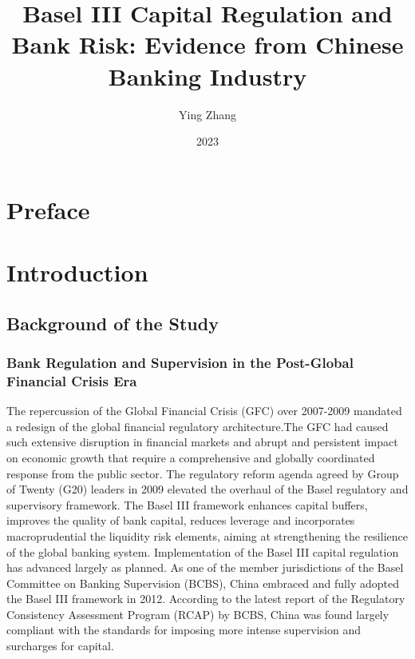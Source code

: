 \documentclass[
  letterpaper,
  DIV=11,
  numbers=noendperiod]{scrreprt}
\title{Basel III Capital Regulation and Bank Risk: Evidence from Chinese
Banking Industry}
\author{Ying Zhang}
\date{2023}
\renewcommand*\contentsname{Table of contents}
\newcommand\contentsname{Table of contents}
\begin{document}
\maketitle

\renewcommand*\contentsname{Table of contents}
{
\hypersetup{linkcolor=}
\setcounter{tocdepth}{2}
\tableofcontents
}

\chapter*{Preface}\label{preface}



\chapter{Introduction}\label{introduction}

\section{Background of the Study}\label{background-of-the-study}

\subsection{Bank Regulation and Supervision in the Post-Global Financial
Crisis
Era}\label{bank-regulation-and-supervision-in-the-post-global-financial-crisis-era}

The repercussion of the Global Financial Crisis (GFC) over 2007-2009
mandated a redesign of the global financial regulatory architecture.The
GFC had caused such extensive disruption in financial markets and abrupt
and persistent impact on economic growth that require a comprehensive
and globally coordinated response from the public sector. The regulatory
reform agenda agreed by Group of Twenty (G20) leaders in 2009 elevated
the overhaul of the Basel regulatory and supervisory framework. The
Basel III framework enhances capital buffers, improves the quality of
bank capital, reduces leverage and incorporates macroprudential the
liquidity risk elements, aiming at strengthening the resilience of the
global banking system. Implementation of the Basel III capital
regulation has advanced largely as planned. As one of the member
jurisdictions of the Basel Committee on Banking Supervision (BCBS),
China embraced and fully adopted the Basel III framework in 2012.
According to the latest report of the Regulatory Consistency Assessment
Program (RCAP) by BCBS, China was found largely compliant with the
standards for imposing more intense supervision and surcharges for
capital.
\end{document}
